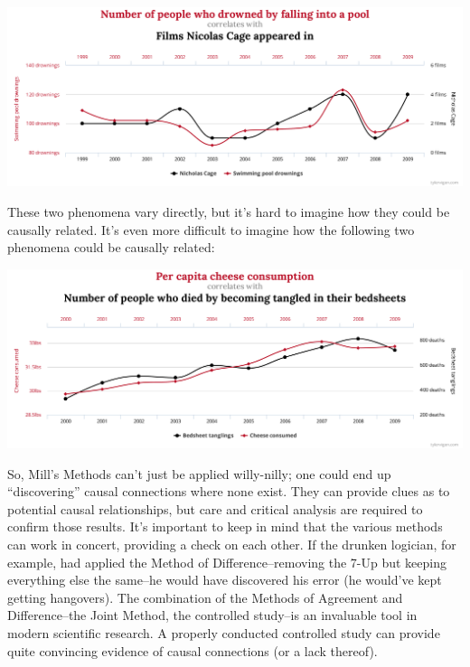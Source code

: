 \noindent
\includegraphics[scale=.23]{pooldiagram.pdf}

These two phenomena vary directly, but it's hard to imagine how they could be causally related.
It's even more difficult to imagine how the following two phenomena could be causally related:

\noindent
\includegraphics[scale=.23]{cheesediagram.pdf}


So, Mill's Methods can't just be applied willy-nilly; one could end up ``discovering'' causal
connections where none exist. They can provide clues as to potential causal relationships, but care
and critical analysis are required to confirm those results. It's important to keep in mind that the
various methods can work in concert, providing a check on each other. If the drunken logician, for
example, had applied the Method of Difference--removing the 7-Up but keeping everything else
the same--he would have discovered his error (he would've kept getting hangovers). The
combination of the Methods of Agreement and Difference--the Joint Method, the controlled
study--is an invaluable tool in modern scientific research. A properly conducted controlled study
can provide quite convincing evidence of causal connections (or a lack thereof).

